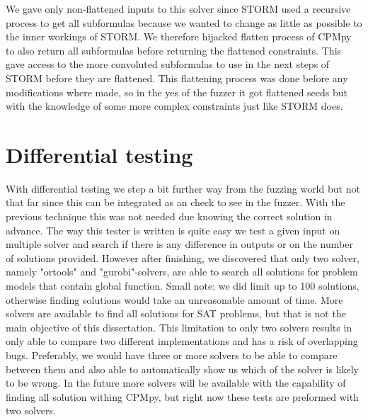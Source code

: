 We gave only non-flattened inputs to this solver since STORM used a recursive process to get all subformulas because we wanted to change as little as possible to the inner workings of STORM. We therefore hijacked flatten process of CPMpy to also return all subformulas before returning the flattened constraints. This gave access to the more convoluted subformulas to use in the next steps of STORM before they are flattened. This flattening process was done before any modifications where made, so in the yes of the fuzzer it got flattened seeds but with the knowledge of some more complex constraints just like STORM does.


%

\section{Differential testing}
With differential testing we step a bit further way from the fuzzing world but not that far since this can be integrated as an check to see in the fuzzer. With the previous technique this was not needed due knowing the correct solution in advance. The way this tester is written is quite easy we test a given input on multiple solver and search if there is any difference in outputs or on the number of solutions provided.
However after finishing, we discovered that only two solver, namely "ortools" and "gurobi"-solvers, are able to search all solutions for problem models that contain global function. Small note: we did limit up to 100 solutions, otherwise finding solutions would take an unreasonable amount of time. More solvers are available to find all solutions for SAT problems, but that is not the main objective of this dissertation. This limitation to only two solvers results in only able to compare two different implementations and has a risk of overlapping bugs. Preferably, we would have three or more solvers to be able to compare between them and also able to automatically show us which of the solver is likely to be wrong. In the future more solvers will be available with the capability of finding all solution withing CPMpy, but right now these tests are preformed with two solvers. 

